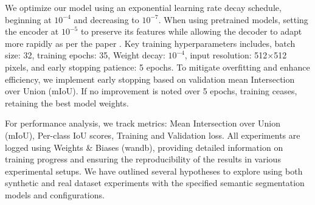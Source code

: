 \documentclass[../report.tex]{subfiles}
\begin{document}
    We optimize our model using an exponential learning rate decay schedule, beginning at $10^{-4}$ and decreasing to $10^{-7}$. When using pretrained models, setting the encoder at $10^{-5}$ to preserve its features while allowing the decoder to adapt more rapidly as per the paper \cite{lyu2020uavid}.
    Key training hyperparameters includes, batch size: 32, training epochs: 35, Weight decay: $10^{-4}$, input resolution: 512×512 pixels, and early stopping patience: 5 epochs. To mitigate overfitting and enhance efficiency, we implement early stopping based on validation mean Intersection over Union (mIoU). If no improvement is noted over 5 epochs, training ceases, retaining the best model weights. 

    For performance analysis, we track metrics: Mean Intersection over Union (mIoU), Per-class IoU scores, Training and Validation loss. 
    All experiments are logged using Weights \& Biases (wandb), providing detailed information on training progress and ensuring the reproducibility of the results in various experimental setups.
    We have outlined several hypotheses to explore using both synthetic and real dataset experiments with the specified semantic segmentation models and configurations.   
    
\end{document}
